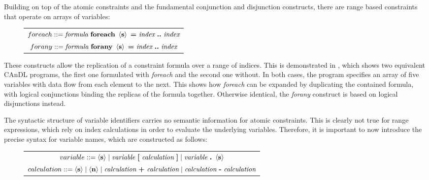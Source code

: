     Building on top of the atomic constraints and the fundamental conjunction
    and disjunction constructs, there are range based constraints that operate
    on arrays of variables:
\begin{figure}[h]
  \centering
  \begin{tabular}{|c|}
    \hline
    $foreach ::= \text{\it formula}\ \text{\bf foreach}\ \left<\text{\bf s}\right>\ \text{\bf =}\ \text{\it index}\ \text{\bf ..}\ \text{\it index}$\\
    $forany ::= \text{\it formula}\ \text{\bf forany}\ \left<\text{\bf s}\right>\ \text{\bf =}\ \text{\it index}\ \text{\bf ..}\ \text{\it index}$\\
    \hline
  \end{tabular}
\end{figure}

    \noindent
    These constructs allow the replication of a constraint formula over a range
    of indices.
    This is demonstrated in , which shows two equivalent
    CAnDL programs, the first one formulated with {\it foreach} and the
    second one without.
    In both cases, the program specifies an array of five variables with data
    flow from each element to the next.
    This shows how {\it foreach} can be expanded by duplicating the contained
    formula, with logical conjunctions binding the replicas of the
    formula together.
    Otherwise identical, the {\it forany} construct is based on logical
    disjunctions instead.

    The syntactic structure of variable identifiers carries no semantic
    information for atomic constraints.
    This is clearly not true for range expressions, which rely on index
    calculations in order to evaluate the underlying variables.
    Therefore, it is important to now introduce the precise syntax for variable
    names, which are constructed as follows:

\begin{figure}[h]
  \centering
  \begin{tabular}{|c|}
    \hline
    $variable ::= \left<\text{\bf s}\right>\mid\text{\it variable}\ \text{\bf [}\ \text{\it calculation}\ \text{\bf ]}\mid\text{\it variable}\ \text{\bf.}\ \left<\text{\bf s}\right>$\\
    $calculation ::= \left<\text{\bf s}\right>\mid\left<\text{\bf n}\right>\mid\text{\it calculation}\ \text{\bf+}\ \text{\it calculation}\mid\text{\it calculation}\ \text{\bf-}\ \text{\it calculation}$\\
    \hline
  \end{tabular}
\end{figure}

